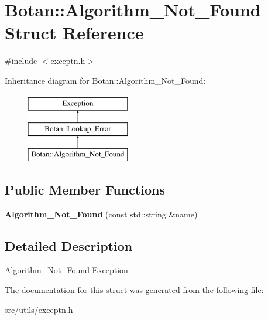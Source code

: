\hypertarget{structBotan_1_1Algorithm__Not__Found}{\section{Botan\-:\-:Algorithm\-\_\-\-Not\-\_\-\-Found Struct Reference}
\label{structBotan_1_1Algorithm__Not__Found}
}


{\ttfamily \#include $<$exceptn.\-h$>$}

Inheritance diagram for Botan\-:\-:Algorithm\-\_\-\-Not\-\_\-\-Found\-:\begin{figure}[H]
\begin{center}
\leavevmode
\includegraphics[height=3.000000cm]{structBotan_1_1Algorithm__Not__Found}
\end{center}
\end{figure}
\subsection*{Public Member Functions}
\begin{DoxyCompactItemize}
\item 
\hypertarget{structBotan_1_1Algorithm__Not__Found_a50d5616c1f1644318264af70479b0fcb}{{\bfseries Algorithm\-\_\-\-Not\-\_\-\-Found} (const std\-::string \&name)}\label{structBotan_1_1Algorithm__Not__Found_a50d5616c1f1644318264af70479b0fcb}

\end{DoxyCompactItemize}


\subsection{Detailed Description}
\hyperlink{structBotan_1_1Algorithm__Not__Found}{Algorithm\-\_\-\-Not\-\_\-\-Found} Exception 

The documentation for this struct was generated from the following file\-:\begin{DoxyCompactItemize}
\item 
src/utils/exceptn.\-h\end{DoxyCompactItemize}
